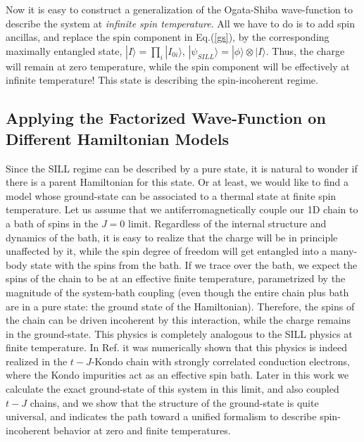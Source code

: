 \documentclass[article,11pt]{revtex4}
\begin{document}
Now it is easy to construct a generalization of the Ogata-Shiba wave-function to describe the system at {\it infinite spin temperature}. All we have to do is to add spin ancillas, and replace the spin component in Eq.(\ref{gs}), by the corresponding maximally entangled state, $|I \rangle = \prod_i |I_{0i}\rangle$, $|\psi_{SILL}\rangle=|\phi\rangle \otimes |I\rangle$. Thus, the charge will remain at zero temperature, while the spin component will be effectively at infinite temperature! This state is describing the spin-incoherent regime.

\subsection {Applying the Factorized Wave-Function on Different Hamiltonian Models}

Since the SILL regime can be described by a pure state, it is natural to wonder if there is a parent Hamiltonian for this state. Or at least, we would like to find a model whose ground-state can be associated to a thermal state at finite spin temperature.
Let us assume that we antiferromagnetically couple our 1D chain to a bath of spins in the $J=0$ limit. Regardless of the internal structure and dynamics of the bath, it is easy to realize that the charge will be in principle unaffected by it, while the spin degree of freedom will get entangled into a many-body state with the spins from the bath. If we trace over the bath, we expect the spins of the chain to be at an effective finite temperature, parametrized by the magnitude of the system-bath coupling (even though the entire chain plus bath are in a pure state: the ground state of the Hamiltonian). Therefore, the spins of the chain can be driven incoherent by this interaction, while the charge remains in the ground-state. This physics is completely analogous to the SILL physics at finite temperature. 
In Ref. it was numerically shown that this physics is indeed realized in the $t-J$-Kondo chain with strongly correlated conduction electrons, where the Kondo impurities act as an effective spin bath. Later in this work we calculate the exact ground-state of this system in this limit, and also coupled $t-J$ chains, and we show that the structure of the ground-state is quite universal, and indicates the path toward a unified formalism to describe spin-incoherent behavior at zero and finite temperatures.
\end{document}

